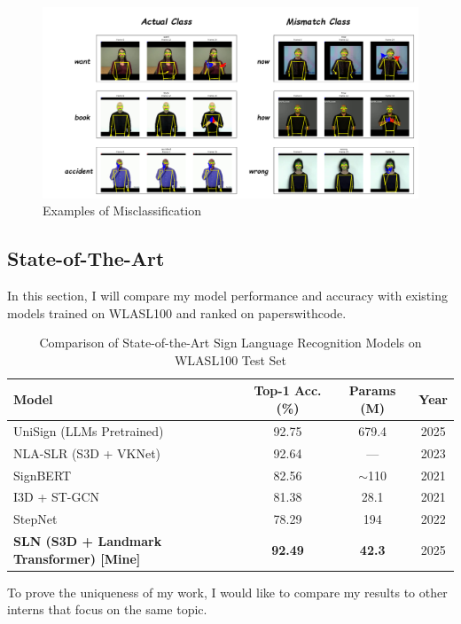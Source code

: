 \documentclass{article}
\begin{document}
\begin{figure}[H]
    \centering
    \includegraphics[width=1\linewidth]{Fig/Mismatch.drawio.png}
    \caption{Examples of Misclassification}
    \label{fig:enter-label}
\end{figure}

\subsection{State-of-The-Art}
In this section, I will compare my model performance and accuracy with existing models trained on WLASL100 \cite{paperswithcode_wlasl100} and ranked on paperswithcode.

\begin{table}[H]
\centering
\begin{tabular}{|l|c|c|c|}
\hline
\textbf{Model} & \textbf{Top-1 Acc. (\%)} & \textbf{Params (M)} & \textbf{Year} \\
\hline
UniSign (LLMs Pretrained) \cite{li2025uni-sign} & 92.75 & 679.4 & 2025 \\
NLA-SLR (S3D + VKNet) \cite{zuo2023natural} & 92.64 & --- & 2023 \\
SignBERT \cite{hu2021signbert} & 82.56 & $\sim$110 & 2021 \\
I3D + ST-GCN \cite{maruyama2021wordlevel} & 81.38 & 28.1 & 2021 \\
StepNet \cite{pan2022stepnet} & 78.29 & 194 & 2022 \\
\hline
\textbf{SLN (S3D + Landmark Transformer) [Mine]} & \textbf{92.49} & \textbf{42.3} & 2025 \\
\hline
\end{tabular}
\caption{Comparison of State-of-the-Art Sign Language Recognition Models on WLASL100 Test Set}
\label{tab:sota_comparison}
\end{table}

To prove the uniqueness of my work, I would like to compare my results to other interns that focus on the same topic.
\end{document}
